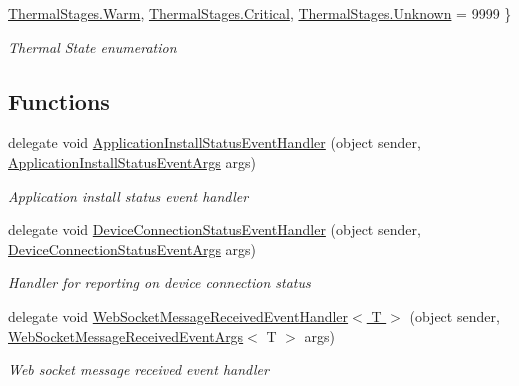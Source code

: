 \begin{DoxyCompactItemize}
\hyperlink{namespace_microsoft_1_1_tools_1_1_windows_device_portal_aba1cf1ca5947296337c5aedd4fa37bf4a18297117d3d251afceed9ecbe797c849}{Thermal\+Stages.\+Warm}, 
\hyperlink{namespace_microsoft_1_1_tools_1_1_windows_device_portal_aba1cf1ca5947296337c5aedd4fa37bf4a278d01e5af56273bae1bb99a98b370cd}{Thermal\+Stages.\+Critical}, 
\hyperlink{namespace_microsoft_1_1_tools_1_1_windows_device_portal_aba1cf1ca5947296337c5aedd4fa37bf4a88183b946cc5f0e8c96b2e66e1c74a7e}{Thermal\+Stages.\+Unknown} = 9999
 \}\begin{DoxyCompactList}\small\item\em Thermal State enumeration \end{DoxyCompactList}
\end{DoxyCompactItemize}
\subsection*{Functions}
\begin{DoxyCompactItemize}
\item 
delegate void \hyperlink{namespace_microsoft_1_1_tools_1_1_windows_device_portal_a090bafbb778fef68cd8b97d373800c99}{Application\+Install\+Status\+Event\+Handler} (object sender, \hyperlink{class_microsoft_1_1_tools_1_1_windows_device_portal_1_1_application_install_status_event_args}{Application\+Install\+Status\+Event\+Args} args)
\begin{DoxyCompactList}\small\item\em Application install status event handler \end{DoxyCompactList}\item 
delegate void \hyperlink{namespace_microsoft_1_1_tools_1_1_windows_device_portal_a7cf019b0c750e52495263f4fb0df9ead}{Device\+Connection\+Status\+Event\+Handler} (object sender, \hyperlink{class_microsoft_1_1_tools_1_1_windows_device_portal_1_1_device_connection_status_event_args}{Device\+Connection\+Status\+Event\+Args} args)
\begin{DoxyCompactList}\small\item\em Handler for reporting on device connection status \end{DoxyCompactList}\item 
delegate void \hyperlink{namespace_microsoft_1_1_tools_1_1_windows_device_portal_aabd55565b1172f54b61bc5bcb4537a90}{Web\+Socket\+Message\+Received\+Event\+Handler$<$ T $>$} (object sender, \hyperlink{class_microsoft_1_1_tools_1_1_windows_device_portal_1_1_web_socket_message_received_event_args}{Web\+Socket\+Message\+Received\+Event\+Args}$<$ T $>$ args)
\begin{DoxyCompactList}\small\item\em Web socket message received event handler \end{DoxyCompactList}\end{DoxyCompactItemize}


